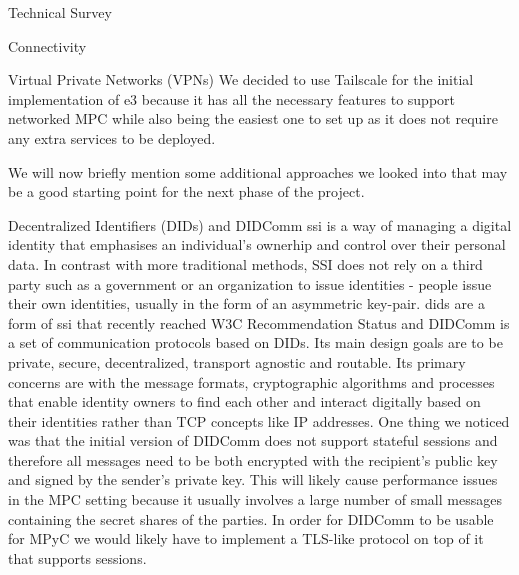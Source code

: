 \begin{frame}{Technical Survey}
\begin{block}{Connectivity}
\begin{block}{Virtual Private Networks (VPNs)}
We decided to use Tailscale for the initial implementation of \gls{e3}
because it has all the necessary features to support networked MPC while
also being the easiest one to set up as it does not require any extra
services to be deployed.

We will now briefly mention some additional approaches we looked into
that may be a good starting point for the next phase of the project.
\end{block}

\begin{block}{Decentralized Identifiers (DIDs) and DIDComm}
\protect\hypertarget{decentralized-identifiers-dids-and-didcomm}{}
\gls{ssi} is a way of managing a digital identity that emphasises an
individual's ownerhip and control over their personal data. In contrast
with more traditional methods, SSI does not rely on a third party such
as a government or an organization to issue identities - people issue
their own identities, usually in the form of an asymmetric key-pair.
\glspl{did}\autocite{didW3C} are a form of \gls{ssi} that recently
reached W3C Recommendation Status and DIDComm\autocite{didcommSpec} is a
set of communication protocols based on DIDs. Its main design goals are
to be private, secure, decentralized, transport agnostic and routable.
Its primary concerns are with the message formats, cryptographic
algorithms and processes that enable identity owners to find each other
and interact digitally based on their identities rather than TCP
concepts like IP addresses. One thing we noticed was that the initial
version of DIDComm does not support stateful sessions and therefore all
messages need to be both encrypted with the recipient's public key and
signed by the sender's private key. This will likely cause performance
issues in the MPC setting because it usually involves a large number of
small messages containing the secret shares of the parties. In order for
DIDComm to be usable for MPyC we would likely have to implement a
TLS-like protocol on top of it that supports sessions.
\end{block}


\end{block}
\end{frame}
